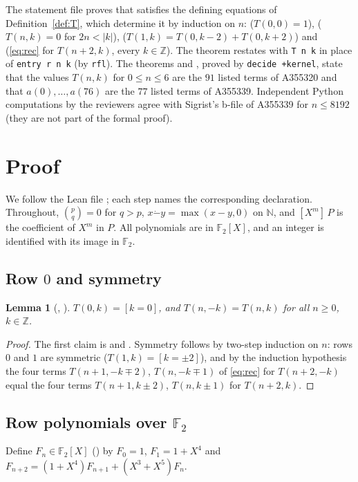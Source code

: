 \documentclass[11pt]{amsart}
\theoremstyle{plain}
\newtheorem{lemma}[theorem]{Lemma}
\theoremstyle{definition}
\newcommand{\F}{\mathbb{F}_2}
\newcommand{\N}{\mathbb{N}}
\newcommand{\Z}{\mathbb{Z}}
\newcommand{\tsub}{\mathbin{\dot{-}}}
\newcommand{\co}[2]{[X^{#1}]\,#2}
\begin{document}
The statement file proves that  satisfies the defining equations of Definition~\ref{def:T}, which determine it by induction on $n$:  ($T(0,0)=1$),  ($T(n,k)=0$ for $2n<|k|$),  ($T(1,k)=T(0,k-2)+T(0,k+2)$) and  (\eqref{eq:rec} for $T(n+2,k)$, every $k\in\Z$). The theorem  restates  with \texttt{T n k} in place of \texttt{entry r n k} (by \texttt{rfl}). The theorems  and , proved by \texttt{decide +kernel}, state that the values $T(n,k)$ for $0\le n\le 6$ are the $91$ listed terms of A355320 and that $a(0),\dots,a(76)$ are the $77$ listed terms of A355339. Independent Python computations by the reviewers agree with Sigrist's b-file of A355339 for $n\le 8192$ (they are not part of the formal proof).

\section{Proof}\label{sec:proof}

We follow the Lean file ; each step names the corresponding declaration. Throughout, $\binom pq=0$ for $q>p$, $x\tsub y=\max(x-y,0)$ on $\N$, and $\co{m}{P}$ is the coefficient of $X^m$ in $P$. All polynomials are in $\F[X]$, and an integer is identified with its image in $\F$.

\subsection{\texorpdfstring{Row $0$ and symmetry}{Row 0 and symmetry}}

\begin{lemma}[, ]\label{lem:symm}
$T(0,k)=[k=0]$, and $T(n,-k)=T(n,k)$ for all $n\ge0$, $k\in\Z$.
\end{lemma}

\begin{proof}
The first claim is  and . Symmetry follows by two-step induction on $n$: rows $0$ and $1$ are symmetric ($T(1,k)=[k=\pm2]$), and by the induction hypothesis the four terms $T(n+1,-k\mp2)$, $T(n,-k\mp1)$ of \eqref{eq:rec} for $T(n+2,-k)$ equal the four terms $T(n+1,k\pm2)$, $T(n,k\pm1)$ for $T(n+2,k)$.
\end{proof}

\subsection{\texorpdfstring{Row polynomials over $\mathbb{F}_2$}{Row polynomials over F2}}
Define $F_n\in\F[X]$ () by $F_0=1$, $F_1=1+X^4$ and $F_{n+2}=(1+X^4)F_{n+1}+(X^3+X^5)F_n$.
\end{document}
